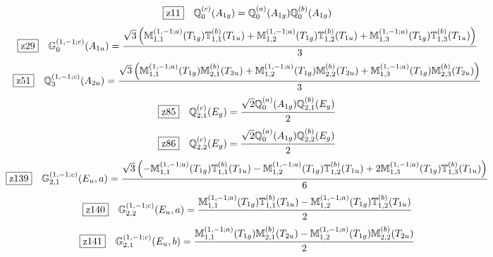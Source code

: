 \documentclass[fleqn,10pt,landscape]{jsarticle}
\begin{document}
\begin{dmath*}
\hspace*{3mm}\fbox{z11}\quad \mathbb{Q}_{0}^{(c)}(A_{1g})=\mathbb{Q}_{0}^{(a)}(A_{1g}) \mathbb{Q}_{0}^{(b)}(A_{1g})
\end{dmath*}
\begin{dmath*}
\hspace*{3mm}\fbox{z29}\quad \mathbb{G}_{0}^{(1,-1;c)}(A_{1u})=\frac{\sqrt{3} \left(\mathbb{M}_{1,1}^{(1,-1;a)}(T_{1g}) \mathbb{T}_{1,1}^{(b)}(T_{1u}) + \mathbb{M}_{1,2}^{(1,-1;a)}(T_{1g}) \mathbb{T}_{1,2}^{(b)}(T_{1u}) + \mathbb{M}_{1,3}^{(1,-1;a)}(T_{1g}) \mathbb{T}_{1,3}^{(b)}(T_{1u})\right)}{3}
\end{dmath*}
\begin{dmath*}
\hspace*{3mm}\fbox{z51}\quad \mathbb{Q}_{3}^{(1,-1;c)}(A_{2u})=\frac{\sqrt{3} \left(\mathbb{M}_{1,1}^{(1,-1;a)}(T_{1g}) \mathbb{M}_{2,1}^{(b)}(T_{2u}) + \mathbb{M}_{1,2}^{(1,-1;a)}(T_{1g}) \mathbb{M}_{2,2}^{(b)}(T_{2u}) + \mathbb{M}_{1,3}^{(1,-1;a)}(T_{1g}) \mathbb{M}_{2,3}^{(b)}(T_{2u})\right)}{3}
\end{dmath*}
\begin{dmath*}
\hspace*{3mm}\fbox{z85}\quad \mathbb{Q}_{2,1}^{(c)}(E_{g})=\frac{\sqrt{2} \mathbb{Q}_{0}^{(a)}(A_{1g}) \mathbb{Q}_{2,1}^{(b)}(E_{g})}{2}
\end{dmath*}
\begin{dmath*}
\hspace*{3mm}\fbox{z86}\quad \mathbb{Q}_{2,2}^{(c)}(E_{g})=\frac{\sqrt{2} \mathbb{Q}_{0}^{(a)}(A_{1g}) \mathbb{Q}_{2,2}^{(b)}(E_{g})}{2}
\end{dmath*}
\begin{dmath*}
\hspace*{3mm}\fbox{z139}\quad \mathbb{G}_{2,1}^{(1,-1;c)}(E_{u},a)=\frac{\sqrt{3} \left(- \mathbb{M}_{1,1}^{(1,-1;a)}(T_{1g}) \mathbb{T}_{1,1}^{(b)}(T_{1u}) - \mathbb{M}_{1,2}^{(1,-1;a)}(T_{1g}) \mathbb{T}_{1,2}^{(b)}(T_{1u}) + 2 \mathbb{M}_{1,3}^{(1,-1;a)}(T_{1g}) \mathbb{T}_{1,3}^{(b)}(T_{1u})\right)}{6}
\end{dmath*}
\begin{dmath*}
\hspace*{3mm}\fbox{z140}\quad \mathbb{G}_{2,2}^{(1,-1;c)}(E_{u},a)=\frac{\mathbb{M}_{1,1}^{(1,-1;a)}(T_{1g}) \mathbb{T}_{1,1}^{(b)}(T_{1u}) - \mathbb{M}_{1,2}^{(1,-1;a)}(T_{1g}) \mathbb{T}_{1,2}^{(b)}(T_{1u})}{2}
\end{dmath*}
\begin{dmath*}
\hspace*{3mm}\fbox{z141}\quad \mathbb{G}_{2,1}^{(1,-1;c)}(E_{u},b)=\frac{\mathbb{M}_{1,1}^{(1,-1;a)}(T_{1g}) \mathbb{M}_{2,1}^{(b)}(T_{2u}) - \mathbb{M}_{1,2}^{(1,-1;a)}(T_{1g}) \mathbb{M}_{2,2}^{(b)}(T_{2u})}{2}
\end{dmath*}
\end{document}
